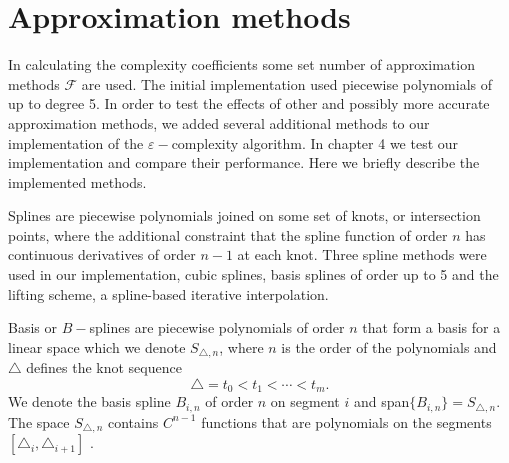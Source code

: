 \section{Approximation methods}

In calculating the complexity coefficients some set 
number of approximation methods $\mathcal{F}$ are used.
The initial implementation used piecewise polynomials of
up to degree 5. In order to test the effects of
other and possibly more accurate approximation methods, we added several additional methods to our implementation
of the $\varepsilon-$complexity algorithm. In chapter 4 
we test our implementation and compare their performance. 
Here we briefly describe the implemented methods.  

Splines are piecewise polynomials joined on some set of knots, or intersection points, where the additional constraint that the spline function of order $n$ has continuous derivatives of order
$n-1$ at each knot. Three spline methods were used in our implementation, cubic splines, basis splines of order up to 5 and the lifting scheme, a spline-based iterative interpolation. 

Basis or $B-$splines are piecewise polynomials of order $n$ 
that form a basis for a linear space which we denote 
 $S_{\triangle,n}$, where $n$ is the order of the 
 polynomials and $\triangle$ defines the knot sequence
\[
  \triangle = {t_0 < t_1 < \cdots < t_m }.
\]
We denote the basis spline $B_{i,n}$ of order $n$ on segment $i$ 
and span$ \{ B_{i,n} \} = S_{\triangle, n}$. 
The space $S_{\triangle, n}$ contains 
$C^{n-1}$ functions that are polynomials on the segments 
$[ \triangle_i, \triangle_{i + 1}]$ \cite{unser1999}. 

